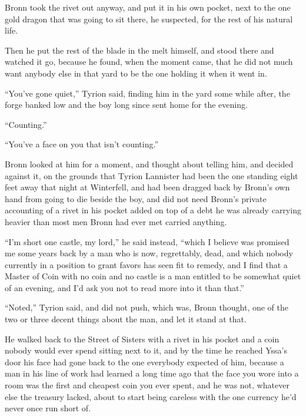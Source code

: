 Bronn took the rivet out anyway, and put it in his own pocket, next to the one gold dragon that was going to sit there, he suspected, for the rest of his natural life.

Then he put the rest of the blade in the melt himself, and stood there and watched it go, because he found, when the moment came, that he did not much want anybody else in that yard to be the one holding it when it went in.

\sceneBreak

“You’ve gone quiet,” Tyrion said, finding him in the yard some while after, the forge banked low and the boy long since sent home for the evening.

“Counting.”

“You’ve a face on you that isn’t counting.”

Bronn looked at him for a moment, and thought about telling him, and decided against it, on the grounds that Tyrion Lannister had been the one standing eight feet away that night at Winterfell, and had been dragged back by Bronn’s own hand from going to die beside the boy, and did not need Bronn’s private accounting of a rivet in his pocket added on top of a debt he was already carrying heavier than most men Bronn had ever met carried anything.

“I’m short one castle, my lord,” he said instead, “which I believe was promised me some years back by a man who is now, regrettably, dead, and which nobody currently in a position to grant favors has seen fit to remedy, and I find that a Master of Coin with no coin and no castle is a man entitled to be somewhat quiet of an evening, and I’d ask you not to read more into it than that.”

“Noted,” Tyrion said, and did not push, which was, Bronn thought, one of the two or three decent things about the man, and let it stand at that.

He walked back to the Street of Sisters with a rivet in his pocket and a coin nobody would ever spend sitting next to it, and by the time he reached Yssa’s door his face had gone back to the one everybody expected of him, because a man in his line of work had learned a long time ago that the face you wore into a room was the first and cheapest coin you ever spent, and he was not, whatever else the treasury lacked, about to start being careless with the one currency he’d never once run short of.